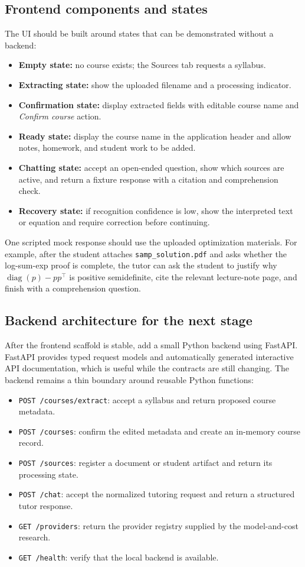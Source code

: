 \documentclass[11pt]{article}
\begin{document}
\subsection{Frontend components and states}
The UI should be built around states that can be demonstrated without a backend:
\begin{itemize}
\item \textbf{Empty state:} no course exists; the Sources tab requests a syllabus.
\item \textbf{Extracting state:} show the uploaded filename and a processing indicator.
\item \textbf{Confirmation state:} display extracted fields with editable course name and \emph{Confirm course} action.
\item \textbf{Ready state:} display the course name in the application header and allow notes, homework, and student work to be added.
\item \textbf{Chatting state:} accept an open-ended question, show which sources are active, and return a fixture response with a citation and comprehension check.
\item \textbf{Recovery state:} if recognition confidence is low, show the interpreted text or equation and require correction before continuing.
\end{itemize}

One scripted mock response should use the uploaded optimization materials. For example, after the student attaches \texttt{samp\_solution.pdf} and asks whether the log-sum-exp proof is complete, the tutor can ask the student to justify why $\operatorname{diag}(p)-pp^\top$ is positive semidefinite, cite the relevant lecture-note page, and finish with a comprehension question.

\subsection{Backend architecture for the next stage}
After the frontend scaffold is stable, add a small Python backend using FastAPI. FastAPI provides typed request models and automatically generated interactive API documentation, which is useful while the contracts are still changing.\cite{fastapi} The backend remains a thin boundary around reusable Python functions:
\begin{itemize}
\item \texttt{POST /courses/extract}: accept a syllabus and return proposed course metadata.
\item \texttt{POST /courses}: confirm the edited metadata and create an in-memory course record.
\item \texttt{POST /sources}: register a document or student artifact and return its processing state.
\item \texttt{POST /chat}: accept the normalized tutoring request and return a structured tutor response.
\item \texttt{GET /providers}: return the provider registry supplied by the model-and-cost research.
\item \texttt{GET /health}: verify that the local backend is available.
\end{itemize}
\end{document}
